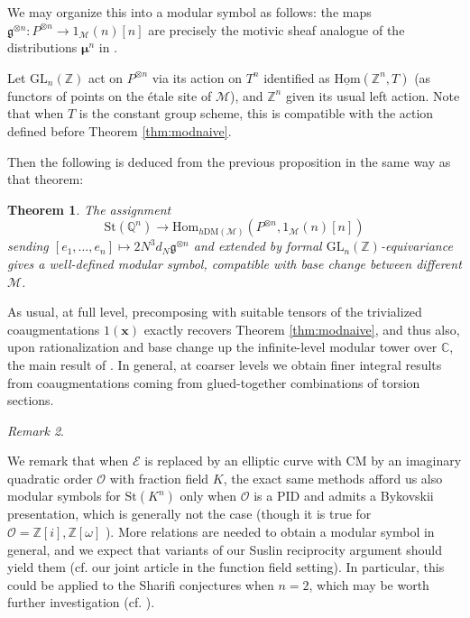 \documentclass[a4paper,reqno,11pt]{amsart}
\theoremstyle{plain}
\newtheorem{theorem}{Theorem}[section]
\theoremstyle{definition}
\theoremstyle{remark}
\newtheorem{remarkwr}[theorem]{Remark}
\newenvironment{remark}{\begin{remarkwr}\begin{upshape}}{\end{upshape}\end{remarkwr}}
\newcommand{\Z}{\mathbb{Z}}
\newcommand{\Q}{\mathbb{Q}}
\newcommand{\DM}{\mathrm{DM}}
\newcommand{\GL}{\mathrm{GL}}
\newcommand{\Hom}{\mathrm{Hom}}
\begin{document}
We may organize this into a modular symbol as follows: the maps $\mathfrak{g}^{\otimes n}:P^{\otimes n} \to 1_{\mathcal{M}}(n)[n]$ are precisely the motivic sheaf analogue of the distributions $\boldsymbol{\mu}^n$ in \cite{BPPS}. 

Let $\GL_n(\Z)$ act on $P^{\otimes n}$ via its action on $T^n$ identified as $\underline{\Hom}(\Z^n, T)$ (as functors of points on the \'{e}tale site of $\mathcal{M}$), and $\Z^n$ given its usual left action. Note that when $T$ is the constant group scheme, this is compatible with the action defined before Theorem \ref{thm:modnaive}. 

Then the following is deduced from the previous proposition in the same way as that theorem:

\begin{theorem} \label{thm:mod}
     The assignment 
     \[
     \mathrm{St}(\Q^n) \to \Hom_{h\DM(\mathcal{M})}(P^{\otimes n}, 1_{\mathcal{M}}(n)[n])
     \]
     sending $[e_1,\ldots, e_n]\mapsto 2N^3 d_N\mathfrak{g}^{\otimes n}$ and extended by formal $\GL_n(\Z)$-equivariance gives a well-defined modular symbol, compatible with base change between different $\mathcal{M}$.
\end{theorem}

As usual, at full level, precomposing with suitable tensors of the trivialized coaugmentations $1(\mathbf{x})$ exactly recovers Theorem \ref{thm:modnaive}, and thus also, upon rationalization and base change up the infinite-level modular tower over $\mathbb{C}$, the main result of \cite{BPPS}. In general, at coarser levels we obtain finer integral results from coaugmentations coming from glued-together combinations of torsion sections.

\begin{remark}
We remark that when $\mathcal{E}$ is replaced by an elliptic curve with CM by an imaginary quadratic order $\mathcal{O}$ with fraction field $K$, the exact same methods afford us also modular symbols for $\mathrm{St}(K^n)$ only when $\mathcal{O}$ is a PID and admits a Bykovskii presentation, which is generally not the case (though it is true for $\mathcal{O}=\Z[i],\Z[\omega]$ \cite{KMPW}). More relations are needed to obtain a modular symbol in general, and we expect that variants of our Suslin reciprocity argument should yield them (cf. our joint article \cite{SX} in the function field setting). In particular, this could be applied to the Sharifi conjectures when $n=2$, which may be worth further investigation (cf. \cite{LSSW}).
\end{remark}

{
}
\end{document}

